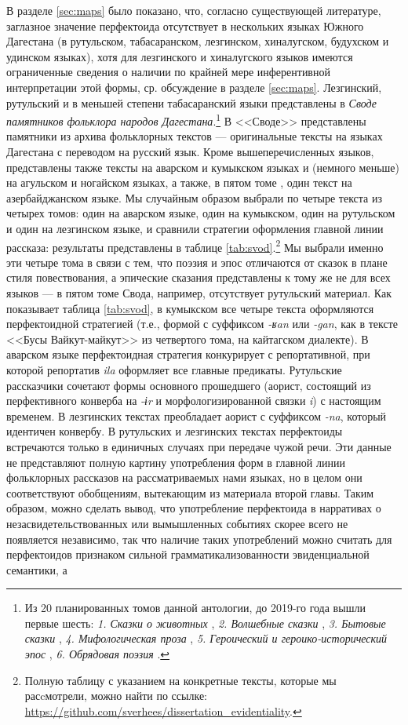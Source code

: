 \par В разделе \ref{sec:maps} было показано, что, согласно существующей литературе, заглазное значение перфектоида отсутствует в нескольких языках Южного Дагестана (в рутульском, табасаранском, лезгинском, хиналугском, будухском и удинском языках), хотя для лезгинского и хиналугского языков имеются ограниченные сведения о наличии по крайней мере инферентивной интерпретации этой формы, ср. обсуждение в разделе \ref{sec:maps}. %
Лезгинский, рутульский и в меньшей степени табасаранский языки представлены в \textit{Своде памятников фольклора народов Дагестана}.\footnote{Из 20 планированных томов данной антологии, до 2019-го года вышли первые шесть: \textit{1. Сказки о животных} \citep{svod1}, \textit{2. Волшебные сказки} \citep{svod2}, \textit{3. Бытовые сказки} \citep{svod3}, \textit{4. Мифологическая проза} \citep{svod4}, \textit{5. Героический и героико-исторический эпос} \citep{svod5}, \textit{6. Обрядовая поэзия} \citep{svod6}.} В <<Своде>> представлены памятники из архива фольклорных текстов --- оригинальные тексты на языках Дагестана с переводом на русский язык. Кроме вышеперечисленных языков, представлены также тексты на аварском и кумыкском языках и (немного меньше) на агульском и ногайском языках, а также, в пятом томе \citep{svod5}, один текст на азербайджанском языке. Мы случайным образом выбрали по четыре текста из четырех томов: один на аварском языке, один на кумыкском, один на рутульском и один на лезгинском языке, и сравнили стратегии оформления главной линии рассказа: результаты представлены в таблице \ref{tab:svod}.\footnote{Полную таблицу с указанием на конкретные тексты, которые мы расcмотрели, можно найти по ссылке: \url{https://github.com/sverhees/dissertation_evidentiality}.} Мы выбрали именно эти четыре тома в связи с тем, что поэзия и эпос отличаются от сказок в плане стиля повествования, а эпические сказания представлены к тому же не для всех языков --- в пятом томе Свода, например, отсутствует рутульский материал. Как показывает таблица \ref{tab:svod}, в кумыкском все четыре текста оформляются перфектоидной стратегией (т.е., формой с суффиксом \textit{-ʁan} или \textit{-gan}, как в тексте <<Бусы Вайкут-майкут>> из четвертого тома, на кайтагском диалекте). В аварском языке перфектоидная стратегия конкурирует с репортативной, при которой репортатив \textit{ila} оформляет все главные предикаты. Рутульские рассказчики сочетают формы основного прошедшего (аорист, состоящий из перфективного конверба на \textit{-ɨr} и морфологизированной связки \textit{i}) с настоящим временем. В лезгинских текстах преобладает аорист с суффиксом \textit{-na}, который идентичен конвербу. В рутульских и лезгинских текстах перфектоиды встречаются только в единичных случаях при передаче чужой речи. Эти данные не представляют полную картину употребления форм в главной линии фольклорных рассказов на рассматриваемых нами языках, но в целом они соответствуют обобщениям, вытекающим из материала второй главы. Таким образом, можно сделать вывод, что употребление перфектоида в нарративах о незасвидетельствованных или вымышленных событиях скорее всего не появляется независимо, так что наличие таких употреблений можно считать для перфектоидов признаком сильной грамматикализованности эвиденциальной семантики, а 